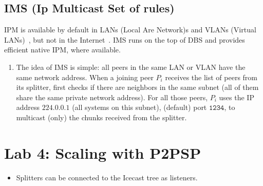 \begin{center}
  \begin{figure*}
  \end{figure*}
  
  \begin{figure*}
  \end{figure*}
  
  \begin{figure*}
  \end{figure*}
  
  \begin{figure*}
  \end{figure*}
  
  \begin{figure*}
  \end{figure*}
  
  \begin{figure*}
  \end{figure*}
  
  \begin{figure*}
  \end{figure*}
  
  \begin{figure*}
  \end{figure*}
  
  \begin{figure*}
  \end{figure*}

\end{center}

\subsection{IMS (Ip Multicast Set of rules)}
IPM is available by default in LANs (Local Are Network)s and VLANs
(Virtual LANs)~\cite{shabtay2011ip}, but not in the
Internet~\cite{Comer1}. IMS runs on the top of DBS and provides
efficient native IPM, where available.

\begin{enumerate}
\item The idea of IMS is simple: all peers in the same LAN or VLAN
  have the same network address. When a joining peer $P_i$ receives
  the list of peers from its splitter, first checks if there are
  neighbors in the same subnet (all of them share the same private
  network address). For all those peers, $P_i$ uses the IP address
  $\mathtt{224.0.0.1}$ (all systems on this subnet), (default) port
  $\mathtt{1234}$, to multicast (only) the chunks received from the
  splitter.
\end{enumerate}

\section*{Lab 4: Scaling with P2PSP}
\begin{center}
\end{center}
\begin{itemize}
  \item Splitters can be connected to the Icecast tree as listeners.
\end{itemize}



